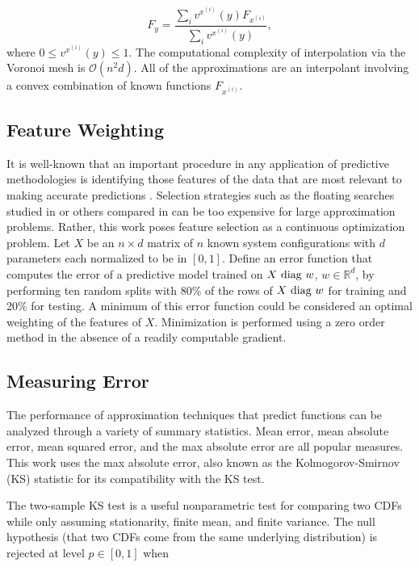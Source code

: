 \documentclass[letterpaper, 10 pt, conference]{ieeeconf}  %
\begin{document}
$$ F_y = \frac{\sum_i v^{x^{(i)}}(y) F_{x^{(i)}}}{\sum_i v^{x^{(i)}}(y)}, $$
where $0 \leq v^{x^{(i)}}(y) \leq 1$. The computational complexity of interpolation via the Voronoi mesh is $\mathcal{O}(n^2 d)$. All of the approximations are an interpolant involving a convex combination of known functions $F_{x^{(i)}}$.
\subsection{Feature Weighting}
\label{sec:feature_weighting}

It is well-known that an important procedure in any application of predictive methodologies is identifying those features of the data that are most relevant to making accurate predictions \cite{guyon2003introduction}. Selection strategies such as the floating searches studied in \cite{pudil1994floating} or others compared in \cite{ferri1994comparative} can be too expensive for large approximation problems. Rather, this work poses feature selection as a continuous optimization problem. Let $X$ be an $n \times d$ matrix of $n$ known system configurations with $d$ parameters each normalized to be in $[0,1]$. Define an error function that computes the error of a predictive model trained on $X\hbox{ diag }w$, $w \in \mathbb{R}^d$,  by performing ten random splits with 80\% of the rows of $X\hbox{ diag }w$ for training and 20\% for testing. A minimum of this error function could be considered an optimal weighting of the features of $X$. Minimization is performed using a zero order method in the absence of a readily computable gradient.

\subsection{Measuring Error}

The performance of approximation techniques that predict functions can be analyzed through a variety of summary statistics. Mean error, mean absolute error, mean squared error, and the max absolute error are all popular measures. This work uses the max absolute error, also known as the Kolmogorov-Smirnov (KS) statistic \cite{lilliefors1967kolmogorov} for its compatibility with the KS test.

The two-sample KS test is a useful nonparametric test for comparing two CDFs while only assuming stationarity, finite mean, and finite variance. The null hypothesis (that two CDFs come from the same underlying distribution) is rejected at level $p \in [0,1]$ when
\end{document}
